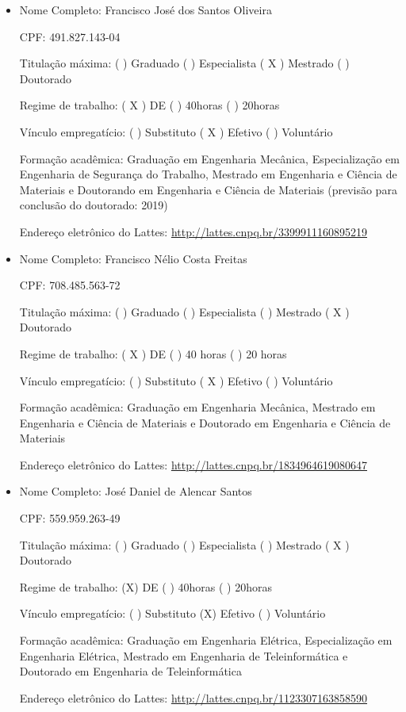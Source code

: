 \documentclass{paper}
\def\web#1{\href{#1}{#1}}
\begin{document}
\begin{itemize}
\item Nome Completo: Francisco José dos Santos Oliveira

 CPF: 491.827.143-04

 Titulação máxima: (  ) Graduado  (  ) Especialista  ( X ) Mestrado (  ) Doutorado

 Regime de trabalho: ( X ) DE  ( ) 40horas (  ) 20horas

 Vínculo empregatício: (  ) Substituto  ( X ) Efetivo  (  ) Voluntário

 Formação acadêmica: Graduação em Engenharia Mecânica, Especialização em Engenharia de Segurança do Trabalho, Mestrado em Engenharia e Ciência de Materiais e Doutorando em Engenharia e Ciência de Materiais (previsão para conclusão do doutorado: 2019)

 Endereço eletrônico do Lattes: \web{http://lattes.cnpq.br/3399911160895219}


\item Nome Completo: Francisco Nélio Costa Freitas

 CPF: 708.485.563-72

 Titulação máxima: (  ) Graduado  (  ) Especialista  (  ) Mestrado  ( X ) Doutorado

 Regime de trabalho: ( X ) DE  (  ) 40 horas  (  ) 20 horas

 Vínculo empregatício: (  ) Substituto  (  X ) Efetivo  (  ) Voluntário

 Formação acadêmica: Graduação em Engenharia Mecânica, Mestrado em Engenharia e Ciência de Materiais e Doutorado em Engenharia e Ciência de Materiais

 Endereço eletrônico do Lattes: \web{http://lattes.cnpq.br/1834964619080647}


\item Nome Completo: José Daniel de Alencar Santos

 CPF: 559.959.263-49

 Titulação máxima: (  ) Graduado (  ) Especialista  (  ) Mestrado ( X ) Doutorado

 Regime de trabalho: (X) DE ( ) 40horas ( ) 20horas

 Vínculo empregatício: (  ) Substituto (X) Efetivo  (  ) Voluntário

 Formação acadêmica: Graduação em Engenharia Elétrica, Especialização em Engenharia Elétrica, Mestrado em Engenharia de Teleinformática e Doutorado em Engenharia de Teleinformática

 Endereço eletrônico do Lattes: \web{http://lattes.cnpq.br/1123307163858590}



\end{itemize}
\end{document}
